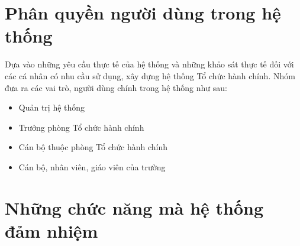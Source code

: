 \section{Phân quyền người dùng trong hệ thống}
Dựa vào những yêu cầu thực tế của hệ thống và những khảo sát thực tế đối với các cá nhân có nhu cầu sử dụng, xây dựng hệ thống Tổ chức hành chính. Nhóm đưa ra các vai trò, người dùng chính trong hệ thống như sau:
\begin{itemize}
    \item Quản trị hệ thống
    \item Trưởng phòng Tổ chức hành chính
    \item Cán bộ thuộc phòng Tổ chức hành chính
    \item Cán bộ, nhân viên, giáo viên của trường
\end{itemize}
\section{Những chức năng mà hệ thống đảm nhiệm}
